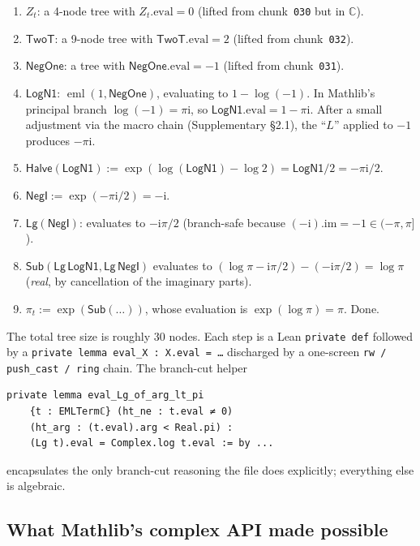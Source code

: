 \documentclass[11pt,a4paper]{article}
\theoremstyle{plain}
\theoremstyle{definition}
\newcommand{\eml}{\operatorname{eml}}
\newcommand{\C}{\mathbb{C}}
\newcommand{\imu}{\mathrm{i}}
\begin{document}
\begin{enumerate}[leftmargin=*,nosep]
\item $Z_t$: a 4-node tree with $Z_t.\mathrm{eval}=0$ (lifted from
chunk~\texttt{030} but in $\C$).
\item $\mathsf{TwoT}$: a 9-node tree with $\mathsf{TwoT}.\mathrm{eval}=2$
(lifted from chunk~\texttt{032}).
\item $\mathsf{NegOne}$: a tree with $\mathsf{NegOne}.\mathrm{eval}=-1$
(lifted from chunk~\texttt{031}).
\item $\mathsf{LogN1}$: $\eml(1, \mathsf{NegOne})$, evaluating to
$1 - \log(-1)$.  In Mathlib's principal branch
$\log(-1) = \pi\imu$, so $\mathsf{LogN1}.\mathrm{eval} = 1 - \pi\imu$.
After a small adjustment via the macro chain (Supplementary §2.1), the
``$L$'' applied to $-1$ produces $-\pi\imu$.
\item $\mathsf{Halve}(\mathsf{LogN1}) := \exp(\log(\mathsf{LogN1}) -
\log 2) = \mathsf{LogN1}/2 = -\pi\imu/2$.
\item $\mathsf{NegI} := \exp(-\pi\imu/2) = -\imu$.
\item $\mathsf{Lg}(\mathsf{NegI})$: evaluates to $-\imu\pi/2$
(branch-safe because $(-\imu).\mathrm{im} = -1 \in (-\pi,\pi]$).
\item $\mathsf{Sub}(\mathsf{Lg}\,\mathsf{LogN1}, \mathsf{Lg}\,\mathsf{NegI})$
evaluates to $(\log\pi - \imu\pi/2) - (-\imu\pi/2) = \log\pi$
(\emph{real}, by cancellation of the imaginary parts).
\item $\pi_t := \exp(\mathsf{Sub}(\dots))$, whose evaluation is
$\exp(\log\pi) = \pi$.  Done.
\end{enumerate}

The total tree size is roughly 30 nodes.  Each step is a Lean
\texttt{private def} followed by a \texttt{private lemma eval\_X : X.eval
= \dots} discharged by a one-screen \texttt{rw / push\_cast / ring}
chain.  The branch-cut helper

\begin{lstlisting}
private lemma eval_Lg_of_arg_lt_pi
    {t : EMLTermℂ} (ht_ne : t.eval ≠ 0)
    (ht_arg : (t.eval).arg < Real.pi) :
    (Lg t).eval = Complex.log t.eval := by ...
\end{lstlisting}

\noindent encapsulates the only branch-cut reasoning the file does
explicitly; everything else is algebraic.

\subsection{What Mathlib's complex API made possible}
\end{document}
